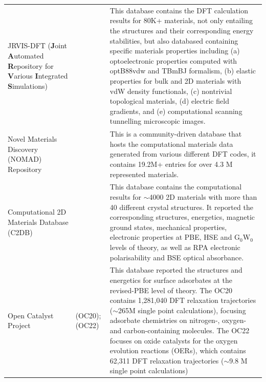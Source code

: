 \begin{longtable}{p{3cm}p{3cm}p{11cm}}
\footnotesize{JRVIS-DFT (\textbf{J}oint \textbf{A}utomated \textbf{R}epository for \textbf{V}arious \textbf{I}ntegrated \textbf{S}imulations)}
&\footnotesize{\citet{choudhary2020joint}}
&\footnotesize{This database contains the DFT calculation results for 80K+ materials, not only entailing the structures and their corresponding energy stabilities, but also databased containing specific materials properties including (a) optoelectronic properties computed with optB88vdw  and TBmBJ formalism\cite{choudhary2018computational}, (b) elastic properties for bulk and 2D materials with vdW density functionals\cite{choudhary2018elastic}, (c) nontrivial topological materials\cite{choudhary2019high}, (d) electric field gradients\cite{choudhary2020density}, and (e) computational scanning tunnelling microscopic images\cite{choudhary2021computational}. }\\

\footnotesize{Novel Materials Discovery (NOMAD) Repository}
&\footnotesize{\citet{draxl2019nomad}}
&\footnotesize{This is a community-driven database that hosts the computational materials data generated from various different DFT codes, it contains 19.2M+ entries for over 4.3 M represented materials.}\\

\footnotesize{Computational 2D Materials Database (C2DB)}
&\footnotesize{\citet{Haastrup_2018,Gjerding_2021}}
&\footnotesize{This database contains the computational results for  $\sim$4000 2D materials with more than 40 different crystal structures. It reported the corresponding structures, energetics, magnetic ground states, mechanical properties, electronic properties at PBE, HSE and G$_0$W$_0$ levels of theory, as well as RPA electronic polarisability and BSE optical absorbance. }\\

\footnotesize{Open Catalyst Project}
&\footnotesize{\citet{chanussot2021open} (OC20); \citet{tran2023open} (OC22)}
&\footnotesize{This database reported the structures and energetics for surface adsorbates at the revised-PBE level of theory\cite{Hammer1999RPBE}. The OC20 contains 1,281,040 DFT relaxation trajectories ($\sim$265M single point calculations), focusing adsorbate chemistries on nitrogen-, oxygen- and carbon-containing molecules. The OC22 focuses on oxide catalysts for the oxygen evolution reactions (OERs), which contains 62,311 DFT relaxation trajectories ($\sim$9.8 M single point calculations)}\\

\end{longtable}
\endgroup


